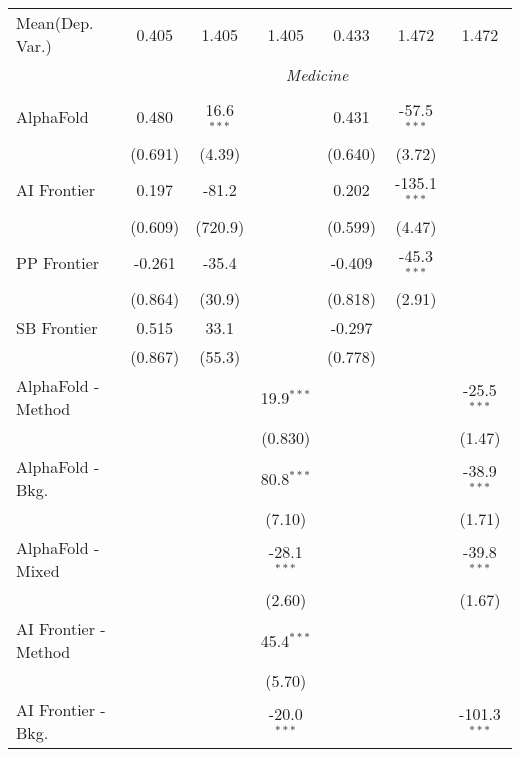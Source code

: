 \begin{tabular}{lcccccc}
Mean(Dep. Var.) & 0.405 & 1.405 & 1.405 & 0.433 & 1.472 & 1.472 \\
 & \multicolumn{6}{c}{\textit{Medicine}} \\ \\
   AlphaFold            & 0.480   & 16.6$^{***}$ &               & 0.431   & -57.5$^{***}$  &   \\   
                        & (0.691) & (4.39)       &               & (0.640) & (3.72)         &   \\   
   AI Frontier          & 0.197   & -81.2        &               & 0.202   & -135.1$^{***}$ &   \\   
                        & (0.609) & (720.9)      &               & (0.599) & (4.47)         &   \\   
   PP Frontier          & -0.261  & -35.4        &               & -0.409  & -45.3$^{***}$  &   \\   
                        & (0.864) & (30.9)       &               & (0.818) & (2.91)         &   \\   
   SB Frontier          & 0.515   & 33.1         &               & -0.297  &                &   \\   
                        & (0.867) & (55.3)       &               & (0.778) &                &   \\   
   AlphaFold - Method   &         &              & 19.9$^{***}$  &         &                & -25.5$^{***}$\\   
                        &         &              & (0.830)       &         &                & (1.47)\\   
   AlphaFold - Bkg.     &         &              & 80.8$^{***}$  &         &                & -38.9$^{***}$\\   
                        &         &              & (7.10)        &         &                & (1.71)\\   
   AlphaFold - Mixed    &         &              & -28.1$^{***}$ &         &                & -39.8$^{***}$\\   
                        &         &              & (2.60)        &         &                & (1.67)\\   
   AI Frontier - Method &         &              & 45.4$^{***}$  &         &                &   \\   
                        &         &              & (5.70)        &         &                &   \\   
   AI Frontier - Bkg.   &         &              & -20.0$^{***}$ &         &                & -101.3$^{***}$\\   

\end{tabular}
